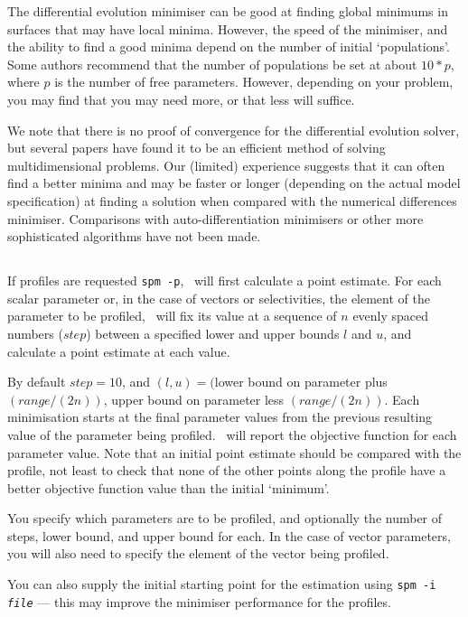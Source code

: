 The differential evolution minimiser can be good at finding global minimums in surfaces that may have local minima. However, the speed of the minimiser, and the ability to find a good minima depend on the number of initial `populations'. Some authors recommend that the number of populations be set at about $10*p$, where $p$ is the number of free parameters. However, depending on your problem, you may find that you may need more, or that less will suffice.

We note that there is no proof of convergence for the differential evolution solver, but several papers have found it to be an efficient method of solving multidimensional problems. Our (limited) experience suggests that it can often find a better minima and may be faster or longer (depending on the actual model specification) at finding a solution when compared with the numerical differences minimiser. Comparisons with auto-differentiation minimisers or other more sophisticated algorithms have not been made. 

\subsection{\label{sec:estimate-profiles}}

If profiles are requested \texttt{spm -p}, \SPM\ will first calculate a point estimate. For each scalar parameter or, in the case of vectors or selectivities, the element of the parameter to be profiled, \SPM\ will fix its value at a sequence of $n$ evenly spaced numbers ($step$) between a specified lower and upper bounds $l$ and $u$, and calculate a point estimate at each value. 

By default $step=10$, and $(l, u)=($lower bound on parameter plus $(range/(2n))$, upper bound on parameter less $(range/(2n))$. Each minimisation starts at the final parameter values from the previous resulting value of the parameter being profiled. \SPM\ will report the objective function for each parameter value. Note that an initial point estimate should be compared with the profile, not least to check that none of the other points along the profile have a better objective function value than the initial `minimum'.

You specify which parameters are to be profiled, and optionally the number of steps, lower bound, and upper bound for each. In the case of vector parameters, you will also need to specify the element of the vector being profiled. 

You can also supply the initial starting point for the estimation using \texttt{spm -i \emph{file}} --- this may improve the minimiser performance for the profiles.

